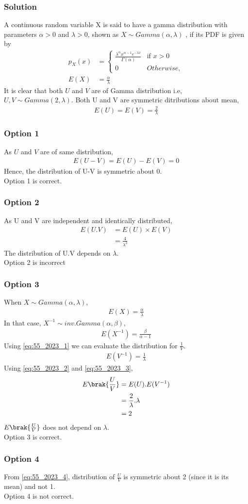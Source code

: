 \documentclass{beamer}
\begin{document}
\begin{frame}
\frametitle{Solution}
A continuous random variable X is said to have a gamma distribution with parameters $\alpha>0$ and $\lambda>0$, shown as $X \sim Gamma(\alpha,\lambda)$
, if its PDF is given by
\begin{align}
p_{X}(x) &= 
\begin{cases}
\frac{\lambda^{\alpha}x^{\alpha-1}e^{-\lambda x}}{\Gamma(\alpha)} & \text{if } x > 0\\
0 & Otherwise,
\end{cases}\\
E(X)&=\frac{\alpha}{\lambda}
\end{align}
It is clear that both $U$ and $V$ are of Gamma distribution i.e, $U,V \sim Gamma(2,\lambda)$. Both U and V are symmetric ditributions about mean,
\begin{align}
E(U)=E(V)=\frac{2}{\lambda} \label{eq:55_2023_3}
\end{align}
\end{frame}
\begin{frame}
\frametitle{Option 1}
As $U$ and $V$ are of same distribution, 
\begin{align}
E(U-V) = E(U) - E(V) = 0
\end{align}
Hence, the distribution of U-V is symmetric about 0.\\
Option 1 is correct.
\end{frame}
\begin{frame}
\frametitle{Option 2}
As U and V are independent and identically distributed,
\begin{align}
E(U.V) &= E(U)\times E(V) \\
&= \frac{4}{\lambda^{2}}
\end{align}
The distribution of U.V depends on $\lambda$.\\
Option 2 is incorrect
\end{frame}
\begin{frame}[allowframebreaks]
\frametitle{Option 3}
When $X \sim Gamma(\alpha,\lambda)$,
\begin{align}
E(X) = \frac{\alpha}{\lambda}
\end{align}
In that case, $X^{-1}\sim inv.Gamma(\alpha,\beta)$,
\begin{align}
E(X^{-1}) = \frac{\beta}{\alpha-1} \label{eq:55_2023_1}
\end{align}
Using \eqref{eq:55_2023_1} we can evaluate the distribution for $\frac{1}{V}$.
\begin{align}
E(V^{-1}) = \frac{1}{\lambda}\label{eq:55_2023_2}
\end{align}
Using \eqref{eq:55_2023_2} and \eqref{eq:55_2023_3}, 
\begin{align}
E\brak{\frac{U}{V}} &= E(U).E(V^{-1})\\
&= \frac{2}{\lambda}.\lambda \\ 
&= 2 \label{eq:55_2023_4}
\end{align}
$E\brak{\frac{U}{V}}$ does not depend on $\lambda$.\\
Option 3 is correct.
\end{frame}
\begin{frame}
\frametitle{Option 4}
From \eqref{eq:55_2023_4}, distribution of $\frac{U}{V}$ is symmetric about 2 (since it is its mean) and not 1.\\
Option 4 is not correct.
\end{frame}
\end{document}
